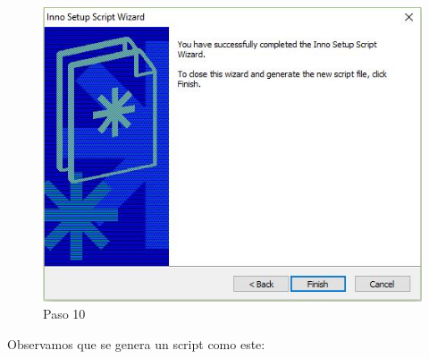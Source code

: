 \begin{figure}[H]
	\centering\includegraphics[scale=0.5]{imagenes/implementacion/10.jpg}
	\caption{Paso 10}
	\label{instaladorPaso10}
\end{figure}

\newpage

Observamos que se genera un script como este:


